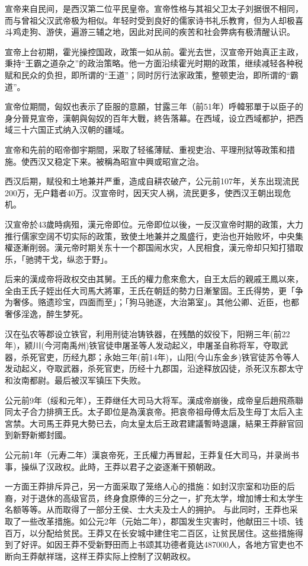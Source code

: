 宣帝来自民间，是西汉第二位平民皇帝。宣帝性格与其祖父卫太子刘据很不相同，而与曾祖父汉武帝极为相似。年轻时受到良好的儒家诗书礼乐教育，但为人却极喜斗鸡走狗、游侠，遍游三辅之地，因此对民间的疾苦和社会弊病有极清醒认识。

宣帝上台初期，霍光操控国政，政策一如从前。霍光去世，汉宣帝开始真正主政，秉持“王霸之道杂之”的政治策略。他一方面沿续霍光时期的政策，继续减轻各种税赋和民众的负担，即所谓的“王道”；同时厉行法家政策，整顿吏治，即所谓的“霸道”。

宣帝位期間，匈奴也表示了臣服的意願，甘露三年（前51年）呼韓邪單于以臣子的身分晉見宣帝，漢朝與匈奴的百年大戰，終告落幕。在西域，设立西域都护，把西域三十六国正式纳入汉朝的疆域。

宣帝和先前的昭帝御宇期間，采取了轻徭薄赋、重视吏治、平理刑狱等政策和措施。使西汉又稳定下来。被稱為昭宣中興或昭宣之治。

西汉后期，赋役和土地兼并严重，造成自耕农破产，公元前107年，关东出现流民200万，无户籍者40万。汉宣帝时，因天灾人祸，流民更多，使西汉王朝出现危机。

汉宣帝於43歲時病殂，漢元帝即位。元帝即位以後，一反汉宣帝时期的政策，大力推行儒家空阔不切实际的政策，致使土地兼并之風盛行，吏治也开始败坏，中央集權逐漸削弱。漢元帝时期关东十一个郡国闹水灾，人民相食，漢元帝却只知打猎取乐，「驰骋干戈，纵恣于野」。

后来的漢成帝将政权交由其舅。王氏的權力愈來愈大，自王太后的親戚王鳳以來，全由王氏子姪出任大司馬大將軍，王氏在朝廷的勢力日漸鞏固。王氏得势，更「争为奢侈。赂遗珍宝，四面而至」；「狗马驰逐，大治第室」。其他公卿、近臣，也都奢侈淫逸，醉生梦死。

汉在弘农等郡设立铁官，利用刑徒冶铸铁器，在残酷的奴役下，阳朔三年(前22年)，颍川(今河南禹州)铁官徒申屠圣等人发动起义，申屠圣自称将军，夺取武器，杀死官吏，历经九郡；永始三年(前14年)，山阳(今山东金乡)铁官徒苏令等人发动起义，夺取武器，杀死官吏，历经十九郡国，沿途释放囚徒，杀死汉东郡太守和汝南都尉。最后被汉军镇压下失败。

公元前9年（绥和元年），王莽继任大司马大将军。漢成帝崩後，成帝皇后趙飛燕聯同太子合力排擠王氏。太子即位是為漢哀帝。把哀帝祖母傅太后及生母丁太后入主宮禁。大司馬王莽見大勢已去，向太皇太后王政君建議暫時退讓，結果王莽辭官回到新野新鄉封國。

公元前1年（元寿二年）漢哀帝死，王氏權力再冒起，王莽复任大司马，并录尚书事，操纵了汉政权。此時，王莽以君子之姿逐漸干預朝政。

一方面王莽排斥异己，另一方面采取了笼络人心的措施：如封汉宗室和功臣的后裔，对于退休的高级官员，终身食原俸的三分之一，扩充太学，增加博士和太学生名额等等。从而取得了一部分王侯、士大夫及士人的拥护。 与此同时，王莽也采取了一些改革措施。如公元2年（元始二年），郡国发生灾害时，他献田三十顷、钱百万，以分配给贫民。王莽又在长安城中建住宅二百区，让贫民居住。这些措施得到了好评。如因王莽不受新野田而上书颂其功德者竟达487000人，各地方官吏也不断向王莽献祥瑞，这样王莽实际上控制了汉朝政权。

